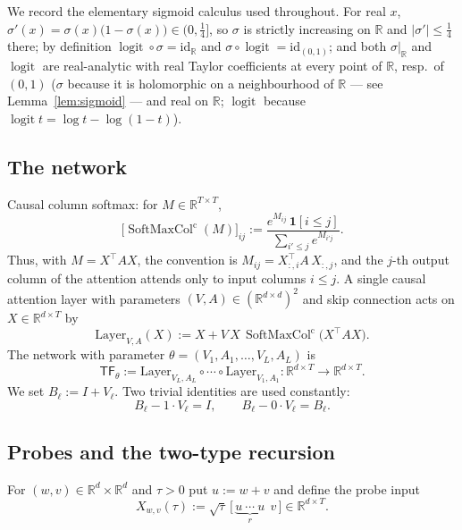 \documentclass[11pt]{article}
\theoremstyle{definition}
\theoremstyle{remark}
\theoremstyle{plain}
\newcommand{\R}{\mathbb{R}}
\newcommand{\logit}{\operatorname{logit}}
\newcommand{\sig}{\sigma}
\newcommand{\TF}{\mathsf{TF}}
\newcommand{\SM}{\operatorname{SoftMaxCol}^{\mathrm{c}}}
\begin{document}
We record the elementary sigmoid calculus used throughout.  For real $x$,
$\sig'(x)=\sig(x)\bigl(1-\sig(x)\bigr)\in(0,\tfrac14]$, so $\sig$ is strictly increasing on
$\R$ and $|\sig'|\le\tfrac14$ there; by definition $\logit\circ\sig=\mathrm{id}_\R$ and
$\sig\circ\logit=\mathrm{id}_{(0,1)}$; and both $\sig|_\R$ and $\logit$ are real-analytic
with real Taylor coefficients at every point of $\R$, resp.\ of $(0,1)$ ($\sig$ because it
is holomorphic on a neighbourhood of $\R$ --- see Lemma~\ref{lem:sigmoid} --- and real on
$\R$; $\logit$ because $\logit t=\log t-\log(1-t)$).

\subsection{The network}
Causal column softmax: for $M\in\R^{T\times T}$,
\[
\big[\SM(M)\big]_{ij}:=\frac{e^{M_{ij}}\,\mathbf 1[i\le j]}{\sum_{i'\le j}e^{M_{i'j}}}.
\]
Thus, with $M=X^\top AX$, the convention is $M_{ij}=X_{:,i}^\top A\,X_{:,j}$, and the
$j$-th output column of the attention attends only to input columns $i\le j$.  A single
causal attention layer with parameters $(V,A)\in(\R^{d\times d})^2$ and skip connection
acts on $X\in\R^{d\times T}$ by
\begin{equation}\label{eq:layer}
\mathrm{Layer}_{V,A}(X):=X+V\,X\,\SM\!\big(X^\top A X\big).
\end{equation}
The network with parameter $\theta=(V_1,A_1,\dots,V_L,A_L)$ is
\[
\TF_\theta:=\mathrm{Layer}_{V_L,A_L}\circ\cdots\circ\mathrm{Layer}_{V_1,A_1}
:\R^{d\times T}\to\R^{d\times T}.
\]
We set $B_\ell:=I+V_\ell$.  Two trivial identities are used constantly:
\begin{equation}\label{eq:transparency}
B_\ell-1\cdot V_\ell=I,\qquad B_\ell-0\cdot V_\ell=B_\ell .
\end{equation}

\subsection{Probes and the two-type recursion}
For $(w,v)\in\R^d\times\R^d$ and $\tau>0$ put $u:=w+v$ and define the probe input
\[
X_{w,v}(\tau):=\sqrt{\tau}\,\big[\,\underbrace{u\ \cdots\ u}_{r}\ \ v\,\big]\in\R^{d\times T}.
\]
\end{document}
